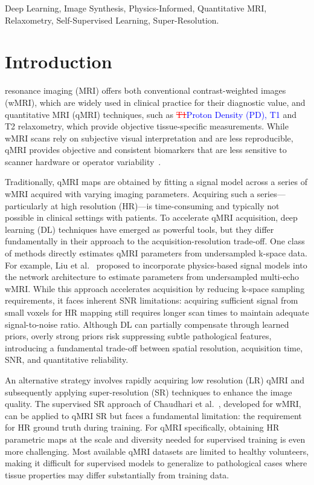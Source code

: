 \documentclass[journal,twoside,web]{ieeecolor}
\newcommand{\added}[1]{\textcolor{blue}{#1}}      %
\newcommand{\deleted}[1]{\textcolor{red}{\st{#1}}} %
\begin{document}
\begin{IEEEkeywords}
Deep Learning, Image Synthesis, Physics-Informed, Quantitative MRI, Relaxometry, Self-Supervised Learning, Super-Resolution.
\end{IEEEkeywords}

\section{Introduction}
\label{sec:introduction}

 resonance imaging (MRI) offers both conventional contrast-weighted images (wMRI), which are widely used in clinical practice for their diagnostic value, and quantitative MRI (qMRI) techniques, such as \deleted{T1}\added{Proton Density (PD), T1} and T2 relaxometry, which provide objective tissue-specific measurements. While wMRI scans rely on subjective visual interpretation and are less reproducible, qMRI provides objective and consistent biomarkers that are less sensitive to scanner hardware or operator variability~\cite{b1,b2}.





Traditionally, qMRI maps are obtained by fitting a signal model across a series of wMRI acquired with varying imaging parameters. Acquiring such a series---particularly at high resolution (HR)---is time-consuming and typically not possible in clinical settings with patients. To accelerate qMRI acquisition, deep learning (DL) techniques have emerged as powerful tools, but they differ fundamentally in their approach to the acquisition-resolution trade-off. One class of methods directly estimates qMRI parameters from undersampled k-space data. For example, Liu et al.~\cite{b3} proposed to incorporate physics-based signal models into the network architecture to estimate parameters from undersampled multi-echo wMRI. While this approach accelerates acquisition by reducing k-space sampling requirements, it faces inherent SNR limitations: acquiring sufficient signal from small voxels for HR mapping still requires longer scan times to maintain adequate signal-to-noise ratio. Although DL can partially compensate through learned priors, overly strong priors risk suppressing subtle pathological features, introducing a fundamental trade-off between spatial resolution, acquisition time, SNR, and quantitative reliability.

An alternative strategy involves rapidly acquiring low resolution (LR) qMRI and subsequently applying super-resolution (SR) techniques to enhance the image quality. The supervised SR approach of Chaudhari et al.~\cite{b4}, developed for wMRI, can be applied to qMRI SR but faces a fundamental limitation: the requirement for HR ground truth during training. For qMRI specifically, obtaining HR parametric maps at the scale and diversity needed for supervised training is even more challenging. Most available qMRI datasets are limited to healthy volunteers, making it difficult for supervised models to generalize to pathological cases where tissue properties may differ substantially from training data. 
\end{document}
